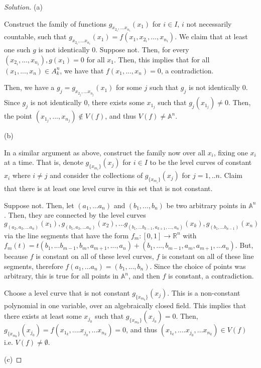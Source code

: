 \documentclass[10pt]{article}
\begin{document}
\begin{proof}[Solution]
(a)

Construct the family of functions $g_{x_{2_i},...x_{n_i}}(x_1)$ for $i \in I$, $i$ not necessarily countable, such that  $g_{x_{2_i},...x_{n_i}}(x_1) = f(x_1,x_{2_i},...,x_{n_i})$. We claim that at least one such $g$ is not identically 0. Suppose not. Then, for every $(x_{2_i},...,x_{n_i}), g(x_1) = 0$ for all $x_1$. Then, this implies that for all $(x_1,...,x_n) \in A_k^n$, we have that $f(x_1,...,x_n) = 0$, a contradiction.

Then, we have a $g_j = g_{x_{2_j},...x_{n_j}}(x_1)$ for some $j$ such that $g_j$ is not identically 0. Since $g_j$ is not identically 0, there exists some $x_{1_j}$ such that $g_j(x_{1_j}) \not= 0$. Then, the point $(x_{1_j},...,x_{n_j}) \not \in V(f)$, and thus $V(f) \not=\mathbb{A}^n$.

(b)

In a similar argument as above, construct the family now over all $x_i$, fixing one $x_i$ at a time. That is, denote $g_{\{x_{m_i}\}}(x_j)$ for $i \in I$ to be the level curves of constant $x_i$ where $i \not = j$ and consider the collections of  $g_{\{x_{m_i}\}}(x_j)$ for $j = 1,..n$. Claim that there is at least one level curve in this set that is not constant.

Suppose not. Then, let $(a_1,...a_n)$ and $(b_1,...,b_n)$ be two arbitrary points in $\mathbb{A}^n$. Then, they are connected by the level curves $g_{(a_2,a_3,...a_n)}(x_1),g_{(b_1,a_3,...a_n)}(x_2),...g_{(b_1,...b_{k-1},a_{k+1},...,a_n)}(x_k),g_{(b_1,...b_{n-1})}(x_n)$ via the line segments that have the form $f_m: [0,1] \rightarrow \mathbb{R}^n$ with $f_m(t) = t(b_1,...b_{m-1},b_m,a_{m+1},...,a_n) + (b_1,...,b_{m-1},a_m,a_{m+1},...a_n)$. But, because $f$ is constant on all of these level curves, $f$ is constant on all of these line segments, therefore $f(a_1,...a_n) = (b_1,...,b_n)$. Since the choice of points was arbitrary, this is true for all points in $\mathbb{A}^n$, and then $f$ is constant, a contradiction.

Choose a level curve that is not constant $g_{\{x_{m_k}\}}(x_j)$. This is a non-constant polynomial in one variable, over an algebraically closed field. This implies that there exists at least some $x_{j_0}$ such that $g_{\{x_{m_k}\}}(x_{j_0}) = 0$. Then, $g_{\{x_{m_k}\}}(x_{j_0}) = f(x_{1_k},....x_{j_0},...x_{n_k}) = 0$, and thus $(x_{1_k},....x_{j_0},...x_{n_k}) \in V(f)$ i.e. $V(f) \not = \emptyset$.

(c)


\end{proof}
\end{document}
